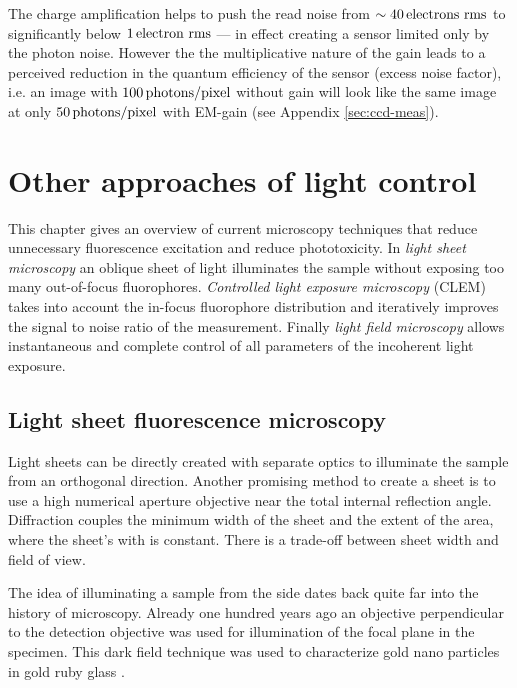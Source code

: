 The charge amplification helps to push the read noise from
$\sim\unit[40]{electrons\ rms}$ to significantly below
$\unit[1]{electron\ rms}$ --- in effect creating a sensor limited only
by the photon noise. However the the multiplicative nature of the gain
leads to a perceived reduction in the quantum efficiency of the sensor
(excess noise factor), i.e. an image with
$\unit[100]{photons/pixel}$ without gain will look like the same image
at only $\unit[50]{photons/pixel}$ with EM-gain (see Appendix
\ref{sec:ccd-meas}).


\chapter{Other approaches of light control}
%
\begin{summary}
  This chapter gives an overview of current microscopy techniques that
  reduce unnecessary fluorescence excitation and reduce
  phototoxicity. In \emph{light sheet microscopy} an oblique sheet of
  light illuminates the sample without exposing too many out-of-focus
  fluorophores. \emph{Controlled light exposure microscopy}
  (CLEM) takes
  into account the in-focus fluorophore distribution and iteratively
  improves the signal to noise ratio of the measurement.  Finally
  \emph{light field microscopy} allows instantaneous and complete
  control of all parameters of the incoherent light exposure.
\end{summary}
\section{Light sheet fluorescence microscopy}
\begin{summary}
  Light sheets can be directly created with separate optics to
  illuminate the sample from an orthogonal direction. Another
  promising method to create a sheet is to use a high numerical
  aperture objective near the total internal reflection
  angle. Diffraction couples the minimum width of the sheet and the
  extent of the area, where the sheet's with is constant. There is a
  trade-off between sheet width and field of view.
\end{summary}
The idea of illuminating a sample from the side dates back quite
far into the history of microscopy. Already one hundred years ago an
objective perpendicular to the detection objective was used for
illumination of the focal plane in the specimen. This dark field
technique was used to characterize gold nano particles in gold ruby
glass \citep{Siedentopf1903}.

